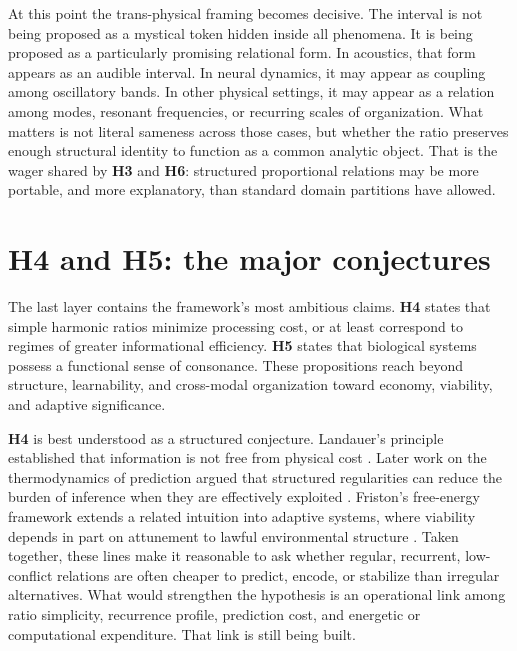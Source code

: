 At this point the trans-physical framing becomes decisive. The interval is not being proposed as a mystical token hidden inside all phenomena. It is being proposed as a particularly promising relational form. In acoustics, that form appears as an audible interval. In neural dynamics, it may appear as coupling among oscillatory bands. In other physical settings, it may appear as a relation among modes, resonant frequencies, or recurring scales of organization. What matters is not literal sameness across those cases, but whether the ratio preserves enough structural identity to function as a common analytic object. That is the wager shared by \textbf{H3} and \textbf{H6}: structured proportional relations may be more portable, and more explanatory, than standard domain partitions have allowed.

\section{H4 and H5: the major conjectures}

The last layer contains the framework's most ambitious claims. \textbf{H4} states that simple harmonic ratios minimize processing cost, or at least correspond to regimes of greater informational efficiency. \textbf{H5} states that biological systems possess a functional sense of consonance. These propositions reach beyond structure, learnability, and cross-modal organization toward economy, viability, and adaptive significance.

\textbf{H4} is best understood as a structured conjecture. Landauer's principle established that information is not free from physical cost \parencite{landauer_1961}. Later work on the thermodynamics of prediction argued that structured regularities can reduce the burden of inference when they are effectively exploited \parencite{still_2012}. Friston's free-energy framework extends a related intuition into adaptive systems, where viability depends in part on attunement to lawful environmental structure \parencite{friston_2010}. Taken together, these lines make it reasonable to ask whether regular, recurrent, low-conflict relations are often cheaper to predict, encode, or stabilize than irregular alternatives. What would strengthen the hypothesis is an operational link among ratio simplicity, recurrence profile, prediction cost, and energetic or computational expenditure. That link is still being built.

